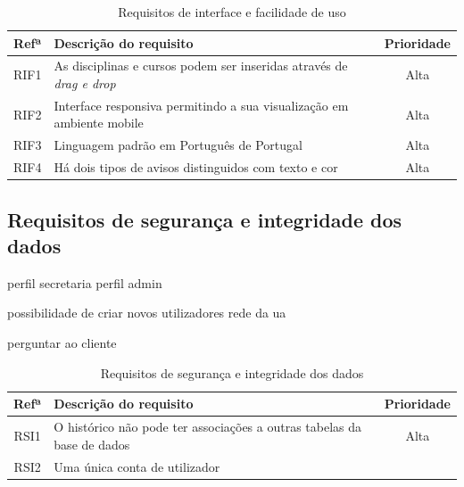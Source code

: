 \documentclass[11pt, twoside]{report}
\begin{document}
	
	\begin{table}[H]
		\caption{Requisitos de interface e facilidade de uso}
		
		\begin{center}
			\begin{tabularx}{\textwidth}{|c|X|c|}
				\hline
				\textbf{Refª } & \textbf{Descrição do requisito}                                            & \textbf{Prioridade} \\
				\hline
				RIF1            & As disciplinas e cursos podem ser inseridas através de \textit{drag e drop} & Alta                \\
				\hline
				RIF2            & Interface responsiva permitindo a sua visualização em ambiente mobile      & Alta                \\
				\hline
				RIF3            & Linguagem padrão em Português de Portugal                                  & Alta                \\
				\hline
				RIF4            & Há dois tipos de avisos distinguidos com texto e cor                        & Alta                \\
				\hline
			\end{tabularx}
			\label{requisitosdeinterface}
		\end{center}
	\end{table}
	
	\subsection{Requisitos de segurança e integridade dos dados}
	
	perfil secretaria 
	perfil admin
	
	possibilidade de criar novos utilizadores
	rede da ua
	
	perguntar ao cliente
	\begin{table}[H]	
		\caption{Requisitos de segurança e integridade dos dados}
		
		
		\begin{center}
			\begin{tabularx}{\textwidth}{|c|X|c|}
				\hline
				\textbf{Refª } & \textbf{Descrição do requisito}                                          & \textbf{Prioridade} \\
				\hline
				RSI1            & O histórico não pode ter associações a outras tabelas da base de dados & Alta                \\
				\hline
				RSI2            & Uma única conta de utilizador                                             &                     \\
				\hline
			\end{tabularx}
			\label{requisitosdeseguranca}
		\end{center}
	\end{table}
	
\end{document}
